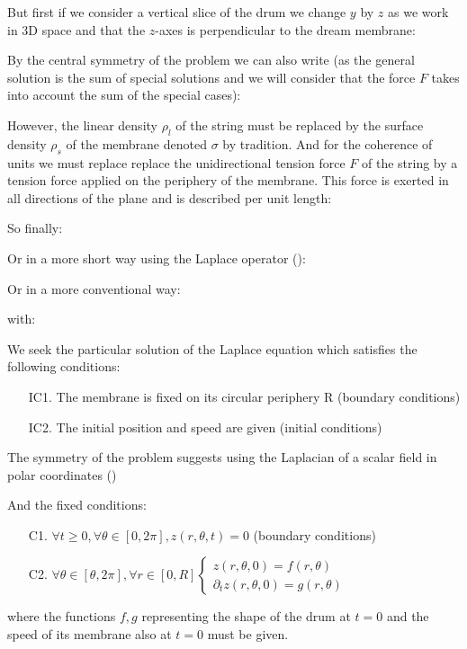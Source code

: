 	But first if we consider a vertical slice of the drum we change $y$ by $z$ as we work in 3D space and that the $z$-axes is perpendicular to the dream membrane:
	
	By the central symmetry of the problem we can also write (as the general solution is the sum of special solutions and we will consider that the force $F$ takes into account the sum of the special cases):
	
	However, the linear density $\rho_l$ of the string must be replaced by the surface density $\rho_s$ of the membrane denoted $\sigma$ by tradition. And for the coherence of units we must replace replace the unidirectional tension force $F$ of the string by a tension force applied on the periphery of the membrane. This force is exerted in all directions of the plane and is described per unit length:
	

	So finally:
	
	Or in a more short way using the Laplace operator ():
	
	Or in a more conventional way:
	
	with:
	
	We seek the particular solution of the Laplace equation which satisfies the following conditions:
	\begin{enumerate}
		\item[IC1.] The membrane is fixed on its circular periphery R (boundary conditions)

		\item[IC2.] The initial position and speed are given (initial conditions)
	\end{enumerate}
	The symmetry of the problem suggests using the Laplacian of a scalar field in polar coordinates ()
	
	And the fixed conditions:
	\begin{enumerate}
		\item[C1.] $\forall t\geq 0,\forall \theta\in[0,2\pi],z(r,\theta,t)=0$ (boundary conditions)

		\item[C2.] $\forall \theta \in [\theta,2\pi],\forall r\in[0,R] \begin{cases} z(r,\theta,0)=f(r,\theta) \\ \partial_t z(r,\theta,0)=g(r,\theta)  \end{cases}$
	\end{enumerate}
	where the functions $f,g$ representing the shape of the drum at $t=0$ and the speed of its membrane also at $t=0$ must be given.
	
